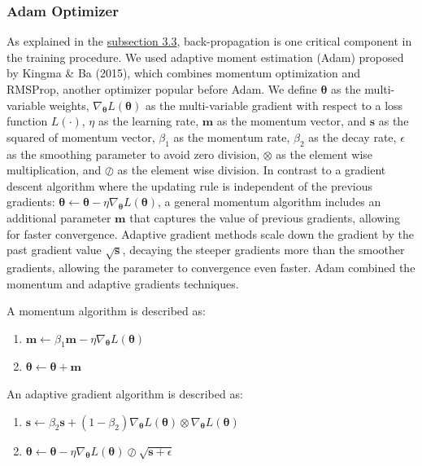 \documentclass[12pt]{article}
\providecommand{\tightlist}{%
  \setlength{\itemsep}{0pt}\setlength{\parskip}{0pt}}
\begin{document}
\hypertarget{adam}{%
\subsubsection{Adam Optimizer}\label{adam}}

As explained in the \protect\hyperlink{nn_model}{subsection 3.3}, back-propagation
is one critical component in the training procedure.
We used adaptive moment estimation (Adam) proposed by
Kingma \& Ba (2015), which combines momentum optimization and
RMSProp, another optimizer popular before Adam. We define
\(\mathbf{\theta}\) as the multi-variable weights,
\(\nabla_{\mathbf{\theta}}L(\mathbf{\theta})\) as the
multi-variable gradient with respect to a loss function \(L(\cdot)\),
\(\eta\) as the learning rate,
\(\mathbf{m}\) as the momentum vector, and \(\mathbf{s}\) as the
squared of momentum vector,
\(\beta_1\) as the momentum rate,
\(\beta_2\) as the decay rate,
\(\epsilon\) as the smoothing parameter to avoid zero
division,
\(\otimes\) as the element wise multiplication,
and \(\oslash\) as the element wise division.
In contrast to a gradient descent algorithm where the
updating rule is independent of the previous gradients:
\(\mathbf{\theta} \leftarrow \mathbf{\theta} - \eta \nabla_{\mathbf{\theta}} L(\mathbf{\theta})\),
a general momentum algorithm includes an additional parameter
\(\mathbf{m}\) that captures the value of previous gradients,
allowing for faster convergence.
Adaptive gradient methods scale down the gradient by the
past gradient value \(\sqrt{\mathbf{s}}\), decaying the steeper
gradients more than the smoother gradients, allowing the
parameter to convergence even faster.
Adam combined the momentum and adaptive gradients
techniques.

A momentum algorithm is described as:

\begin{enumerate}
\def\labelenumi{\arabic{enumi}.}
\tightlist
\item
  \(\mathbf{m} \leftarrow \beta_1 \mathbf{m} - \eta \nabla_{\mathbf{\theta}}L(\mathbf{\theta})\)
\item
  \(\mathbf{\theta}\leftarrow \mathbf{\theta} + \mathbf{m}\)
\end{enumerate}

An adaptive gradient algorithm is described as:

\begin{enumerate}
\def\labelenumi{\arabic{enumi}.}
\tightlist
\item
  \(\mathbf{s} \leftarrow \beta_2 \mathbf{s} + (1-\beta_2) \nabla_{\mathbf{\theta}} L(\mathbf{\theta}) \otimes \nabla_{\mathbf{\theta}}L(\mathbf{\theta})\)
\item
  \(\mathbf{\theta} \leftarrow \mathbf{\theta} - \eta \nabla_{\mathbf{\theta}}L(\mathbf{\theta}) \oslash \sqrt{\mathbf{s} + \epsilon}\)
\end{enumerate}
\end{document}
